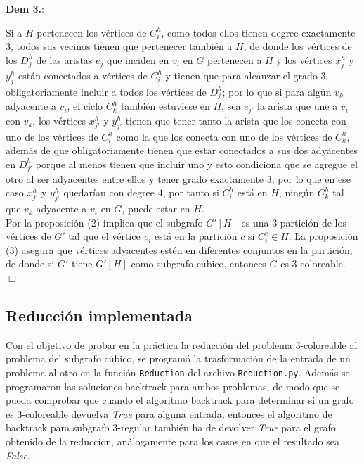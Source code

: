 \documentclass{article}
\begin{document}
\textbf{Dem 3.}: 

Si a $H$ pertenecen los v\'ertices de $C_i^h$, como todos ellos tienen degree exactamente $3$, todos sus vecinos tienen que pertenecer tambi\'en a $H$, de donde 
los v\'ertices de los $D_j^h$ de las aristas $e_j$ que inciden en $v_i$ en $G$ pertenecen a $H$ y los 
v\'ertices $x_j^h$ y $y_j^h$ est\'an conectados a v\'ertices de $C_i^h$ y tienen que para alcanzar el grado $3$ obligatoriamente incluir a todos los v\'ertices de  
$D_j^h$; por lo que si para alg\'un $v_k$ adyacente a $v_i$, el ciclo $C_k^h$ tambi\'en estuviese en $H$, sea $e_{j'}$ la arista que une a $v_i$ con $v_k$, los v\'ertices $x_{j'}^h$ y $y_{j'}^h$  tienen que 
tener tanto la arista que los conecta con uno de los v\'ertices de $C_i^h$ como la que los conecta con uno de los v\'ertices de $C_k^h$, adem\'as de que obligatoriamente tienen que estar conectados a sus dos adyacentes en $D_{j'}^h$ porque 
al menos tienen que incluir uno y esto condiciona que se agregue el otro al ser adyacentes entre ellos y tener grado exactamente $3$, por lo que en ese caso  $x_{j'}^h$ y $y_{j'}^h$ quedar\'ian con degree $4$, por tanto si $C_{i}^h$ est\'a en $H$, ning\'un 
 $C_k^h$ tal que $v_k$ adyacente a $v_i$ en $G$, puede estar en $H$. \\
 

Por la proposici\'on (2) implica que el subgrafo $G'[H]$ es una $3$-partici\'on de los v\'ertices de $G'$ tal que el v\'ertice
$v_i$ est\'a en la partici\'on $c$ si $C_i^c \in H$. La proposici\'on (3) asegura que v\'ertices adyacentes est\'en en diferentes conjuntos en la partici\'on, de donde
si $G'$ tiene $G'[H]$ como subgrafo c\'ubico, entonces $G$ es $3$-coloreable. $\Box$  \\ 

\subsection*{Reducci\'on implementada}
Con el objetivo de probar en la pr\'actica la reducci\'on del problema $3$-coloreable al problema del subgrafo c\'ubico, se program\'o la trasformaci\'on de 
la entrada de un problema al otro en la funci\'on \texttt{Reduction} del archivo \texttt{Reduction.py}. Adem\'as se programaron las soluciones backtrack para ambos problemas,
de modo que se pueda comprobar que cuando el algoritmo backtrack para determinar si un grafo es $3$-coloreable devuelva \textit{True} para alguna entrada, entonces el algoritmo 
de backtrack para subgrafo $3$-regular también ha de devolver \textit{True} para el grafo obtenido de la reducc\'ion, an\'alogamente para los casos en que el resultado sea \textit{False}.\\ 
\end{document}
